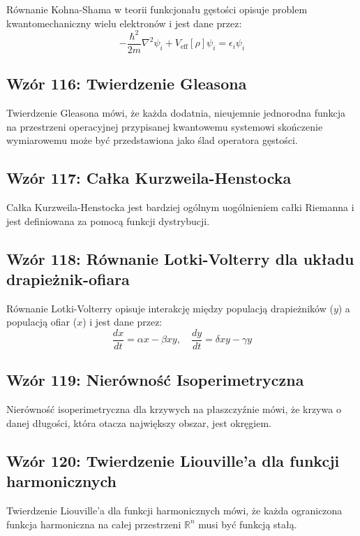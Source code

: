 \documentclass{article}
\begin{document}
Równanie Kohna-Shama w teorii funkcjonału gęstości opisuje problem kwantomechaniczny wielu elektronów i jest dane przez:
\[ -\frac{\hbar^2}{2m} \nabla^2 \psi_i + V_{\text{eff}}[\rho] \psi_i = \epsilon_i \psi_i \]

\subsection*{Wzór 116: Twierdzenie Gleasona}

Twierdzenie Gleasona mówi, że każda dodatnia, nieujemnie jednorodna funkcja na przestrzeni operacyjnej przypisanej kwantowemu systemowi skończenie wymiarowemu może być przedstawiona jako ślad operatora gęstości.

\subsection*{Wzór 117: Całka Kurzweila-Henstocka}

Całka Kurzweila-Henstocka jest bardziej ogólnym uogólnieniem całki Riemanna i jest definiowana za pomocą funkcji dystrybucji.

\subsection*{Wzór 118: Równanie Lotki-Volterry dla układu drapieżnik-ofiara}

Równanie Lotki-Volterry opisuje interakcję między populacją drapieżników (\(y\)) a populacją ofiar (\(x\)) i jest dane przez:
\[ \frac{dx}{dt} = \alpha x - \beta xy, \quad \frac{dy}{dt} = \delta xy - \gamma y \]

\subsection*{Wzór 119: Nierówność Isoperimetryczna}

Nierówność isoperimetryczna dla krzywych na płaszczyźnie mówi, że krzywa o danej długości, która otacza największy obszar, jest okręgiem.

\subsection*{Wzór 120: Twierdzenie Liouville'a dla funkcji harmonicznych}

Twierdzenie Liouville'a dla funkcji harmonicznych mówi, że każda ograniczona funkcja harmoniczna na całej przestrzeni \(\mathbb{R}^n\) musi być funkcją stałą.
\end{document}
